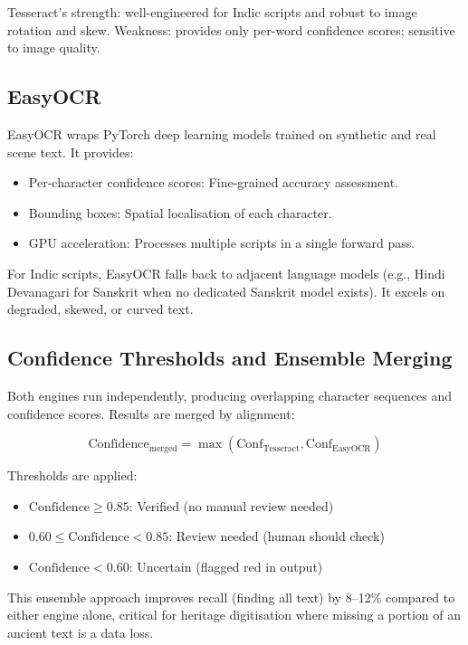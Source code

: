 Tesseract's strength: well-engineered for Indic scripts and robust to image rotation and skew. Weakness: provides only per-word confidence scores; sensitive to image quality.

\subsection{EasyOCR}

EasyOCR wraps PyTorch deep learning models trained on synthetic and real scene text. It provides:

\begin{itemize}
	\item Per-character confidence scores: Fine-grained accuracy assessment.
	\item Bounding boxes: Spatial localisation of each character.
	\item GPU acceleration: Processes multiple scripts in a single forward pass.
\end{itemize}

For Indic scripts, EasyOCR falls back to adjacent language models (e.g., Hindi Devanagari for Sanskrit when no dedicated Sanskrit model exists). It excels on degraded, skewed, or curved text.

\subsection{Confidence Thresholds and Ensemble Merging}

Both engines run independently, producing overlapping character sequences and confidence scores. Results are merged by alignment:

\begin{equation}
\text{Confidence}_{\text{merged}} = \max(\text{Conf}_{\text{Tesseract}}, \text{Conf}_{\text{EasyOCR}})
\end{equation}

Thresholds are applied:
\begin{itemize}
	\item $\text{Confidence} \geq 0.85$: Verified (no manual review needed)
	\item $0.60 \leq \text{Confidence} < 0.85$: Review needed (human should check)
	\item $\text{Confidence} < 0.60$: Uncertain (flagged red in output)
\end{itemize}

This ensemble approach improves recall (finding all text) by 8–12\% compared to either engine alone, critical for heritage digitisation where missing a portion of an ancient text is a data loss.

